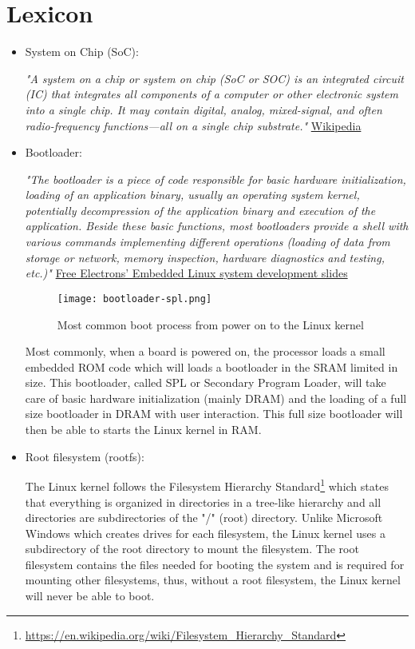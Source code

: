 \chapter*{Lexicon}

\begin{itemize}
\item System on Chip (SoC):

\textit{"A system on a chip or system on chip (SoC or SOC) is an integrated circuit (IC) that integrates all components of a computer or other electronic system into a single chip. It may contain digital, analog, mixed-signal, and often radio-frequency functions—all on a single chip substrate."} \href{https://en.wikipedia.org/wiki/System\_on\_a\_chip}{Wikipedia}

\item Bootloader:

\textit{"The bootloader is a piece of code responsible for basic hardware initialization, loading of an application binary, usually an operating system kernel, potentially decompression of the application binary and execution of the application. Beside these basic functions, most bootloaders provide a shell with various commands implementing different operations (loading of data from storage or network, memory inspection, hardware diagnostics and testing, etc.)"} \href{http://free-electrons.com/doc/training/embedded-linux/embedded-linux-slides.pdf}{Free Electrons' Embedded Linux system development slides}

\begin{figure}[H]
  \centering
  \texttt{[image: bootloader-spl.png]}
  \caption{Most common boot process from power on to the Linux kernel}
\end{figure}

Most commonly, when a board is powered on, the processor loads a small embedded ROM code which will loads a bootloader in the SRAM limited in size. This bootloader, called SPL or Secondary Program Loader, will take care of basic hardware initialization (mainly DRAM) and the loading of a full size bootloader in DRAM with user interaction. This full size bootloader will then be able to starts the Linux kernel in RAM.

\item Root filesystem (rootfs):

The Linux kernel follows the Filesystem Hierarchy Standard\footnote{\url{https://en.wikipedia.org/wiki/Filesystem\_Hierarchy\_Standard}} which states that everything is organized in directories in a tree-like hierarchy and all directories are subdirectories of the "/" (root) directory. Unlike Microsoft Windows which creates drives for each filesystem, the Linux kernel uses a subdirectory of the root directory to mount the filesystem. The root filesystem contains the files needed for booting the system and is required for mounting other filesystems, thus, without a root filesystem, the Linux kernel will never be able to boot.


\end{itemize}
